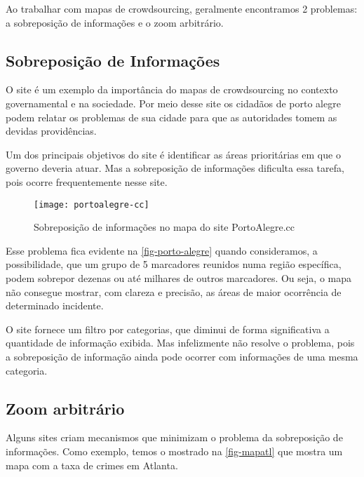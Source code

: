 Ao trabalhar com mapas de crowdsourcing, geralmente encontramos 2 problemas: a sobreposição de informações e o zoom arbitrário. 



\subsection{Sobreposição de Informações}
O site  é um exemplo da importância do mapas de crowdsourcing no contexto governamental e na sociedade. Por meio desse site os cidadãos de porto alegre podem relatar os problemas de sua cidade para que as autoridades tomem as devidas providências. 

Um dos principais objetivos do site é identificar as áreas prioritárias em que o governo deveria atuar. Mas a sobreposição de informações dificulta essa tarefa, pois ocorre frequentemente nesse site. 

\begin{figure}[htb]
	\caption{\label{fig-porto-alegre} Sobreposição de informações no mapa do site PortoAlegre.cc}
	\begin{center}
	    \texttt{[image: portoalegre-cc]}
	\end{center}
\end{figure}

Esse problema fica evidente na \autoref{fig-porto-alegre} quando consideramos, a possibilidade, que um grupo de 5 marcadores reunidos numa região específica, podem sobrepor dezenas ou até milhares de outros marcadores. Ou seja, o mapa não consegue mostrar, com clareza e precisão, as áreas de maior ocorrência de determinado incidente. 

O site fornece um filtro por categorias, que diminui de forma significativa a quantidade de informação exibida.  Mas infelizmente não resolve o problema, pois a sobreposição de informação ainda pode ocorrer com informações de uma mesma categoria.





\subsection{Zoom arbitrário}
Alguns sites criam mecanismos que minimizam o problema da sobreposição de informações. Como exemplo, temos o   mostrado na \autoref{fig-mapatl} que mostra um mapa com a taxa de crimes em Atlanta. 

